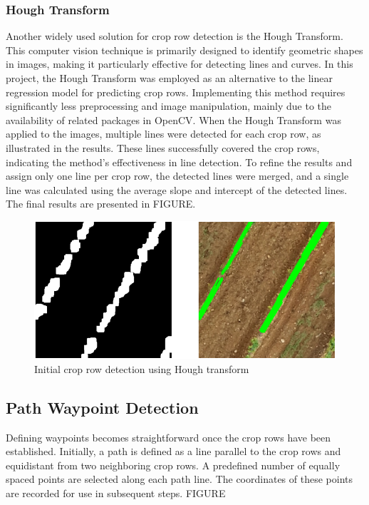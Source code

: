 \documentclass[conference]{IEEEtran}
\begin{document}
\subsubsection{Hough Transform}
Another widely used solution for crop row detection is the Hough Transform. This computer vision technique is primarily designed to identify geometric shapes in images, making it particularly effective for detecting lines and curves. In this project, the Hough Transform was employed as an alternative to the linear regression model for predicting crop rows. Implementing this method requires significantly less preprocessing and image manipulation, mainly due to the availability of related packages in OpenCV. When the Hough Transform was applied to the images, multiple lines were detected for each crop row, as illustrated in the results. These lines successfully covered the crop rows, indicating the method's effectiveness in line detection. To refine the results and assign only one line per crop row, the detected lines were merged, and a single line was calculated using the average slope and intercept of the detected lines. The final results are presented in FIGURE.

\begin{figure}[htbp]
\includegraphics[width=\linewidth]{Hough initial2.png}
\caption{Initial crop row detection using Hough transform}
\label{fig3}
\end{figure}

\subsection{Path Waypoint Detection}
Defining waypoints becomes straightforward once the crop rows have been established. Initially, a path is defined as a line parallel to the crop rows and equidistant from two neighboring crop rows. A predefined number of equally spaced points are selected along each path line. The coordinates of these points are recorded for use in subsequent steps. FIGURE
\end{document}

